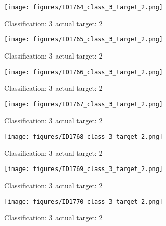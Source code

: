 \begin{figure}[h!]
\begin{center}
\texttt{[image: figures/ID1764\_class\_3\_target\_2.png]}
\end{center}
\caption{ Classification: 3 actual target: 2}
\label{fig:ID1764_class_3_target_2}
\end{figure}
\begin{figure}[h!]
\begin{center}
\texttt{[image: figures/ID1765\_class\_3\_target\_2.png]}
\end{center}
\caption{ Classification: 3 actual target: 2}
\label{fig:ID1765_class_3_target_2}
\end{figure}
\begin{figure}[h!]
\begin{center}
\texttt{[image: figures/ID1766\_class\_3\_target\_2.png]}
\end{center}
\caption{ Classification: 3 actual target: 2}
\label{fig:ID1766_class_3_target_2}
\end{figure}
\begin{figure}[h!]
\begin{center}
\texttt{[image: figures/ID1767\_class\_3\_target\_2.png]}
\end{center}
\caption{ Classification: 3 actual target: 2}
\label{fig:ID1767_class_3_target_2}
\end{figure}
\begin{figure}[h!]
\begin{center}
\texttt{[image: figures/ID1768\_class\_3\_target\_2.png]}
\end{center}
\caption{ Classification: 3 actual target: 2}
\label{fig:ID1768_class_3_target_2}
\end{figure}
\begin{figure}[h!]
\begin{center}
\texttt{[image: figures/ID1769\_class\_3\_target\_2.png]}
\end{center}
\caption{ Classification: 3 actual target: 2}
\label{fig:ID1769_class_3_target_2}
\end{figure}
\begin{figure}[h!]
\begin{center}
\texttt{[image: figures/ID1770\_class\_3\_target\_2.png]}
\end{center}
\caption{ Classification: 3 actual target: 2}
\label{fig:ID1770_class_3_target_2}
\end{figure}
